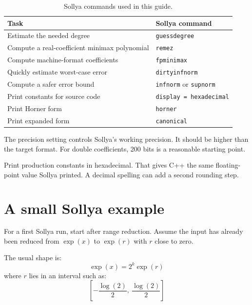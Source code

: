 \documentclass[manuscript, nonacm]{acmart}
\begin{document}
  \begin{table}[tbp]
    \centering
    \caption{Sollya commands used in this guide.}
    \begin{tabular}{ll}
      \toprule
      Task                                          & Sollya command                       \\
      \midrule
      Estimate the needed degree                    & \texttt{guessdegree}                 \\
      Compute a real-coefficient minimax polynomial & \texttt{remez}                       \\
      Compute machine-format coefficients           & \texttt{fpminimax}                   \\
      Quickly estimate worst-case error             & \texttt{dirtyinfnorm}                \\
      Compute a safer error bound                   & \texttt{infnorm} or \texttt{supnorm} \\
      Print constants for source code               & \texttt{display = hexadecimal}       \\
      Print Horner form                             & \texttt{horner}                      \\
      Print expanded form                           & \texttt{canonical}                   \\
      \bottomrule
    \end{tabular}
  \end{table}

  The precision setting controls Sollya's working precision. It should be
  higher than the target format. For double coefficients, 200 bits is a
  reasonable starting point.

  Print production constants in hexadecimal. That gives C++ the same
  floating-point value Sollya printed. A decimal spelling can add a second
  rounding step.



  \section{A small Sollya example}
  \label{sec:sollyaexample}

  For a first Sollya run, start after range reduction. Assume the input has
  already been reduced from $\exp(x)$ to $\exp(r)$ with $r$ close to zero.

  The usual shape is:
  \[ \exp(x) = 2^k \exp(r) \]
  where $r$ lies in an interval such as:
  \[ \left[-\frac{\log(2)}{2},\ \frac{\log(2)}{2}\right] \]
\end{document}
